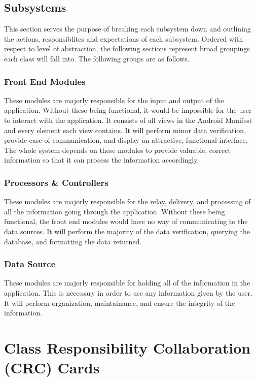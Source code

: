 \documentclass[]{article}
\begin{document}
\FloatBarrier

\subsection{Subsystems}
\label{sub:subsystems}
This section serves the purpose of breaking each subsystem down and outlining the actions, responsiblites and expectations of each subsystem. Ordered with respect to level of abstraction, the following sections represent broad groupings each class will fall into. The following groups are as follows.
\subsubsection{Front End Modules}
These modules are majorly responsible for the input and output of the application. Without these being functional, it would be impossible for the user to interact with the application. It consists of all views in the Android Manifest and every element each view contains. It will perform minor data verification, provide ease of communication, and display an attractive, functional interface. The whole system depends on these modules to provide valuable, correct information so that it can process the information accordingly.
\subsubsection{Processors \& Controllers}
These modules are majorly responsible for the relay, delivery, and processing of all the information going through the application. Without these being functional, the front end modules would have no way of communicating to the data sources. It will perform the majority of the data verification, querying the database, and formatting the data returned.
\subsubsection{Data Source}
These modules are majorly responsible for holding all of the information in the application. This is necessary in order to use any information given by the user. It will perform organization, maintainance, and ensure the integrity of the information.

\section{Class Responsibility Collaboration (CRC) Cards}
\label{sec:class_responsibility_collaboration_crc_cards}
\end{document}

